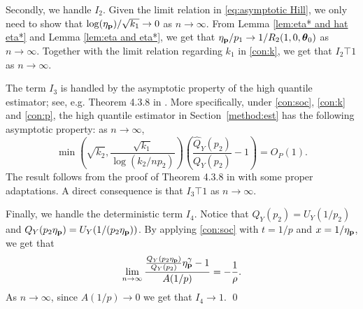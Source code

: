 Secondly, we handle $I_2$. Given the limit relation in \eqref{eq:asymptotic Hill}, we only need to show that $\log (\eta_{\mathbf p})/\sqrt{k_1}\to 0$ as $n\to\infty$. From Lemma \ref{lem:eta* and hat eta*} and Lemma \ref{lem:eta and eta*}, we get that $\eta_{\mathbf p}/p_1\to 1/R_2(1,0,\boldsymbol{\theta}_0)$ as $n\to\infty$. Together with the limit relation regarding $k_1$ in \ref{con:k}, we get that $I_2\top 1$ as $n\to\infty$.

The term $I_3$ is handled by the asymptotic property of the high quantile estimator; see, e.g. Theorem 4.3.8 in \cite{dHF2006_sup}. More specifically, under \ref{con:soc}, \ref{con:k} and \ref{con:p}, the high quantile estimator in Section~\ref{method:est} has the following asymptotic property: as $n\to\infty$,
$$ \min\left(\sqrt{k_2},\frac{\sqrt{k_1}}{\log (k_2/np_2)}\right)\left(\frac{\widehat{Q}_Y(p_2)}{Q_Y(p_2)}-1\right)=O_P(1). $$
The result follows from the proof of Theorem 4.3.8 in \cite{dHF2006_sup} with some proper adaptations. A direct consequence is that $I_3\top1$ as $n\to\infty$.

Finally, we handle the deterministic term $I_4$. Notice that $Q_Y(p_2)=U_Y(1/p_2)$ and $Q_Y(p_2\eta_{\mathbf p})=U_Y(1/(p_2\eta_{\mathbf p}))$. By applying \ref{con:soc} with $t=1/p$ and $x=1/\eta_{\mathbf p}$, we get that
$$\lim_{n\to\infty}\frac{\frac{Q_Y(p_2\eta_{\mathbf p})}{Q_Y(p_2)}\eta_{\mathbf p}^\gamma-1}{A(1/p)}=-\frac{1}{\rho}.$$
As $n\to\infty$, since $A(1/p)\to0$ we get that $I_4\to 1$.
\qed

%    

